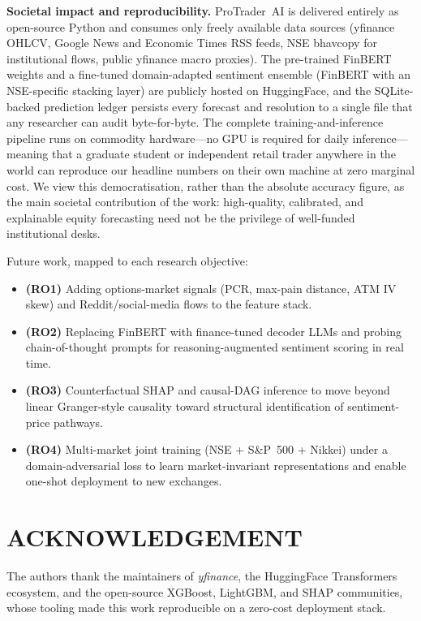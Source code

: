 \textbf{Societal impact and reproducibility.} ProTrader~AI is delivered
entirely as open-source Python and consumes only freely available data
sources (yfinance OHLCV, Google News and Economic Times RSS feeds, NSE
bhavcopy for institutional flows, public yfinance macro proxies). The
pre-trained FinBERT weights and a fine-tuned domain-adapted sentiment
ensemble (FinBERT with an NSE-specific stacking layer) are publicly hosted
on HuggingFace, and the SQLite-backed prediction ledger persists
every forecast and resolution to a single file that any researcher can
audit byte-for-byte. The complete training-and-inference pipeline runs on
commodity hardware---no GPU is required for daily inference---meaning that
a graduate student or independent retail trader anywhere in the world can
reproduce our headline numbers on their own machine at zero marginal cost.
We view this democratisation, rather than the absolute accuracy figure, as
the main societal contribution of the work: high-quality, calibrated, and
explainable equity forecasting need not be the privilege of well-funded
institutional desks.

Future work, mapped to each research objective:
\begin{itemize}
  \item \textbf{(RO1)} Adding options-market signals (PCR, max-pain distance,
        ATM IV skew) and Reddit/social-media flows to the feature stack.
  \item \textbf{(RO2)} Replacing FinBERT with finance-tuned decoder LLMs
        and probing chain-of-thought prompts for reasoning-augmented sentiment
        scoring in real time.
  \item \textbf{(RO3)} Counterfactual SHAP and causal-DAG inference to
        move beyond linear Granger-style causality toward structural
        identification of sentiment-price pathways.
  \item \textbf{(RO4)} Multi-market joint training (NSE + S\&P~500 + Nikkei)
        under a domain-adversarial loss to learn market-invariant representations
        and enable one-shot deployment to new exchanges.
\end{itemize}

\section*{ACKNOWLEDGEMENT}
The authors thank the maintainers of \emph{yfinance}, the HuggingFace
Transformers ecosystem, and the open-source XGBoost, LightGBM, and SHAP
communities, whose tooling made this work reproducible on a zero-cost deployment
stack.

